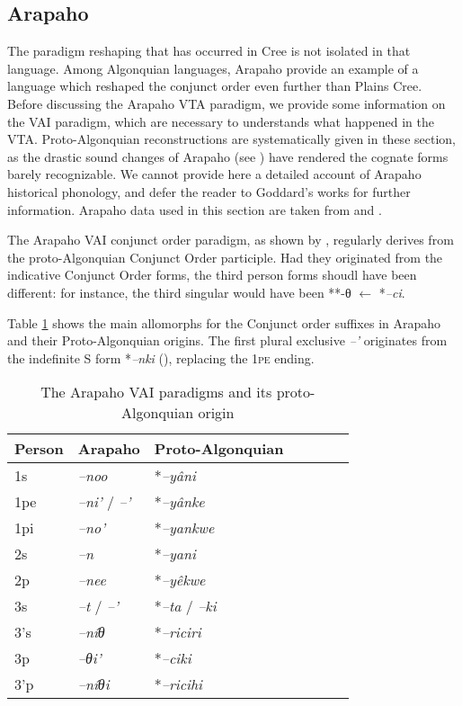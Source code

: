 \documentclass[twoside,a4paper,11pt]{article}
\newcommand{\ipa}[1]{{\phon\textit{#1}}}
\newcommand{\grise}[1]{\cellcolor{lightgray}\textbf{#1}}
\newcommand{\Σ}{\greek{Σ}}
\begin{document}
\subsection{Arapaho}

The paradigm reshaping that has occurred in Cree is not isolated in that language. Among Algonquian languages, Arapaho provide an example of a language which reshaped the conjunct order even further than Plains Cree. Before discussing the Arapaho VTA paradigm, we provide some information on the VAI   paradigm, which are necessary to understands what happened in the VTA. Proto-Algonquian reconstructions are systematically given in these section, as the drastic sound changes of Arapaho (see \citealt{goddard74arapaho}) have rendered the cognate forms barely recognizable. We cannot provide here a detailed account of Arapaho historical phonology, and defer the reader to Goddard's works for further information. Arapaho data used in this section are taken from \citet{salzmann67arapaho.verb} and \citet{cowell06arapaho}.

The Arapaho VAI conjunct order paradigm, as shown by \citet[16-7]{goddard65arapaho}, regularly derives from the proto-Algonquian Conjunct Order participle. Had they originated from the indicative Conjunct Order forms, the third person forms shoudl have been different: for instance, the third singular would have been **-θ $\leftarrow$ *\ipa{--ci}.

Table \ref{tab:arapaho.vai} shows the main  allomorphs for the Conjunct order suffixes in Arapaho and their Proto-Algonquian origins. The first plural exclusive \ipa{--'} originates from the indefinite S form *\ipa{--nki} (\citealt{goddard98morphology.arapaho}), replacing the \textsc{1pe} ending.



\begin{table}[H]
\caption{The Arapaho VAI paradigms and its proto-Algonquian origin}
\centering \label{tab:arapaho.vai}
\begin{tabular}{lllllll}
\toprule
Person &   Arapaho    & Proto-Algonquian\\
\midrule
1s & 	\ipa{--noo} &  	*\ipa{--yâni} & 	\\	
1pe & 	\ipa{--ni'} /  	\ipa{--'}  & 		 *\ipa{--yânke}	\grise{}\\	
1pi & 	\ipa{--no'} & 	 		*\ipa{--yankwe} & 	\\	
\midrule
2s & 	\ipa{--n} & 	 	*\ipa{--yani} & 	\\	
2p & 	\ipa{--nee} & 	  		*\ipa{--yêkwe} & 	\\	
\midrule
3s & 	\ipa{--t} /	\ipa{--'} & 		*\ipa{--ta} / \ipa{--ki}& 	\\	
3's & 	\ipa{--níθ} &  		*\ipa{--riciri} & 	\\	
3p & 	\ipa{--θi'} &  		*\ipa{--ciki} 	\\	
3'p & 	\ipa{--níθi} & 	 		*\ipa{--ricihi} 	\\	
\bottomrule
\end{tabular}
\end{table}
\end{document}
